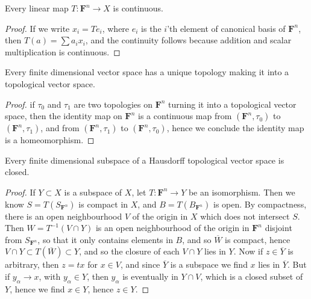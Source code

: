 \begin{lemma}
    Every linear map $T: \mathbf{F}^n \to X$ is continuous.
\end{lemma}
\begin{proof}
    If we write $x_i = Te_i$, where $e_i$ is the $i$'th element of canonical basis of $\mathbf{F}^n$, then $T(a) = \sum a_i x_i$, and the continuity follows because addition and scalar multiplication is continuous.
\end{proof}

\begin{corollary}
    Every finite dimensional vector space has a unique topology making it into a topological vector space.
\end{corollary}
\begin{proof}
    if $\tau_0$ and $\tau_1$ are two topologies on $\mathbf{F}^n$ turning it into a topological vector space, then the identity map on $\mathbf{F}^n$ is a continuous map from $(\mathbf{F}^n, \tau_0)$ to $(\mathbf{F}^n, \tau_1)$, and from $(\mathbf{F}^n, \tau_1)$ to $(\mathbf{F}^n, \tau_0)$, hence we conclude the identity map is a homeomorphism.
\end{proof}

\begin{corollary}
    Every finite dimensional subspace of a Hausdorff topological vector space is closed.
\end{corollary}
\begin{proof}
    If $Y \subset X$ is a subspace of $X$, let $T: \mathbf{F}^n \to Y$ be an isomorphism. Then we know $S = T(S_{\mathbf{F}^n})$ is compact in $X$, and $B = T(B_{\mathbf{F}^n})$ is open. By compactness, there is an open neighbourhood $V$ of the origin in $X$ which does not intersect $S$. Then $W = T^{-1}(V \cap Y)$ is an open neighbourhood of the origin in $\mathbf{F}^n$ disjoint from $S_{\mathbf{F}^n}$, so that it only contains elements in $B$, and so $\overline{W}$ is compact, hence $V \cap Y \subset T(\overline{W}) \subset Y$, and so the closure of each $V \cap Y$ lies in $Y$. Now if $z \in \overline{Y}$ is arbitrary, then $z = tx$ for $x \in V$, and since $\overline{Y}$ is a subspace we find $x$ lies in $\overline{Y}$. But if $y_\alpha \to x$, with $y_\alpha \in Y$, then $y_\alpha$ is eventually in $Y \cap V$, which is a closed subset of $Y$, hence we find $x \in Y$, hence $z \in Y$.
\end{proof}

